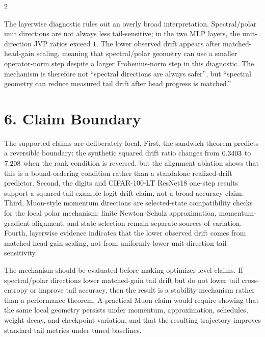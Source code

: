 \documentclass[10pt]{article}
\begin{document}
\begin{multicols}{2}
{The layerwise diagnostic rules out an overly broad interpretation. Spectral/polar unit directions are not always less tail-sensitive; in the two MLP layers, the unit-direction JVP ratios exceed \(1\). The lower observed drift appears after matched-head-gain scaling, meaning that spectral/polar geometry can use a smaller operator-norm step despite a larger Frobenius-norm step in this diagnostic. The mechanism is therefore not ``spectral directions are always safer'', but ``spectral geometry can reduce measured tail drift after head progress is matched.''

\section*{6. Claim Boundary}
The supported claims are deliberately local. First, the sandwich theorem predicts a reversible boundary: the synthetic squared drift ratio changes from \(0.3403\) to \(7.208\) when the rank condition is reversed, but the alignment ablation shows that this is a bound-ordering condition rather than a standalone realized-drift predictor. Second, the digits and CIFAR-100-LT ResNet18 one-step results support a squared tail-example logit drift claim, not a broad accuracy claim. Third, Muon-style momentum directions are selected-state compatibility checks for the local polar mechanism; finite Newton--Schulz approximation, momentum-gradient alignment, and state selection remain separate sources of variation. Fourth, layerwise evidence indicates that the lower observed drift comes from matched-head-gain scaling, not from uniformly lower unit-direction tail sensitivity.

The mechanism should be evaluated before making optimizer-level claims. If spectral/polar directions lower matched-gain tail drift but do not lower tail cross-entropy or improve tail accuracy, then the result is a stability mechanism rather than a performance theorem. A practical Muon claim would require showing that the same local geometry persists under momentum, approximation, schedules, weight decay, and checkpoint variation, and that the resulting trajectory improves standard tail metrics under tuned baselines.

}
\end{multicols}
\end{document}
